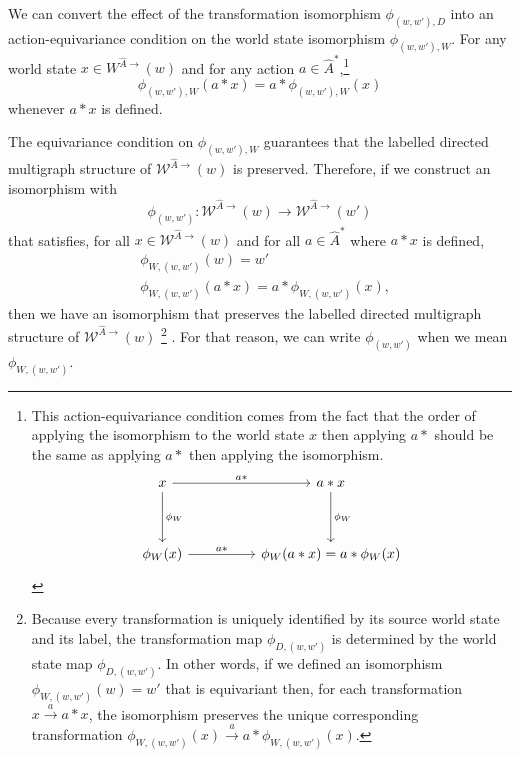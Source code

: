 We can convert the effect of the transformation isomorphism $\phi_{(w,w'), D}$ into an action-equivariance condition on the world state isomorphism $\phi_{(w,w'), W}$.
For any world state $x \in W^{\hat{A}\to}(w)$ and for any action $a \in \hat{A}^{*}$,\footnote{
    This action-equivariance condition comes from the fact that the order of applying the isomorphism to the world state $x$ then applying $a \ast$ should be the same as applying $a \ast$ then applying the isomorphism.
\[\begin{tikzcd}[ampersand replacement=\&]
	x \&\& {a \ast x} \\
	\\
	{\phi_{W}(x)} \&\& {\phi_{W}(a \ast x) = a \ast \phi_{W}(x)}
	\arrow["{a \ast}", from=1-1, to=1-3]
	\arrow["{\phi_{W}}", from=1-1, to=3-1]
	\arrow["{\phi_{W}}", from=1-3, to=3-3]
	\arrow["{a \ast}", from=3-1, to=3-3]
\end{tikzcd}\]
    }
\begin{equation}
    \phi_{(w,w'), W}(a \ast x) = a \ast \phi_{(w,w'), W}(x)
\end{equation}
whenever $a \ast x$ is defined.

The equivariance condition on $\phi_{(w,w'), W}$ guarantees that the labelled directed multigraph structure of $\mathscr{W}^{\hat{A}\to}(w)$ is preserved.
Therefore, if we construct an isomorphism with
\begin{equation}
    \phi_{(w,w')}: \mathscr{W}^{\hat{A}\to}(w) \to \mathscr{W}^{\hat{A}\to}(w')
\end{equation}
that satisfies, for all $x \in \mathscr{W}^{\hat{A}\to}(w)$ and for all $a \in \hat{A}^{*}$ where $a \ast x$ is defined,
\begin{align}
    & \phi_{W,(w,w')}(w) = w' \\
    & \phi_{W,(w,w')}(a \ast x) = a \ast \phi_{W,(w,w')}(x),
\end{align}
then we have an isomorphism that preserves the labelled directed multigraph structure of $\mathscr{W}^{\hat{A}\to}(w)$ \footnote{
Because every transformation is uniquely identified by its source world state and its label, the transformation map $\phi_{D,(w,w')}$ is determined by the world state map $\phi_{D,(w,w')}$.
In other words, if we defined an isomorphism $\phi_{W,(w,w')}(w) = w'$ that is equivariant then, for each transformation $x \xrightarrow{a} a \ast x$, the isomorphism preserves the unique corresponding transformation $\phi_{W,(w,w')}(x) \xrightarrow{a} a \ast \phi_{W,(w,w')}(x)$.
}
.
For that reason, we can write $\phi_{(w,w')}$ when we mean $\phi_{W,(w,w')}$.


